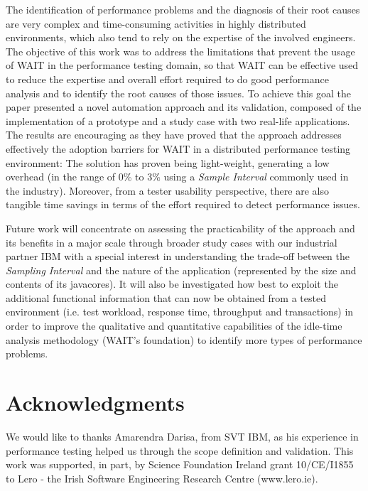 \documentclass[runningheads,a4paper]{llncs}
\begin{document}
The identification of performance problems and the diagnosis of their root
causes are very complex and time-consuming activities in highly distributed
environments, which also tend to rely on the expertise of the involved
engineers. The objective of this work was to address the limitations that
prevent the usage of WAIT in the performance testing domain, so that WAIT can be
effective used to reduce the expertise and overall effort required to do
good performance analysis and to identify the root causes of those issues.
To achieve this goal the paper presented a novel automation approach and its
validation, composed of the implementation of a prototype and a study
case with two real-life applications. The results are encouraging as they have
proved that the approach addresses effectively the adoption barriers for WAIT in 
a distributed performance testing environment: The solution has proven being
light-weight, generating a low overhead (in the range of 0\% to 3\% using a
\emph{Sample Interval} commonly used in the industry). Moreover, from a tester
usability perspective, there are also tangible time savings in terms of the effort required to detect performance issues.

Future work will concentrate on assessing the practicability of the
approach and its benefits in a major scale through broader study cases with our
industrial partner IBM with a special interest in understanding the trade-off
between the \emph{Sampling Interval} and the nature of the application
(represented by the size and contents of its javacores). It will also be
investigated how best to exploit the additional functional information that can
now be obtained from a tested environment (i.e. test workload, response time,
throughput and transactions) in order to improve the qualitative and
quantitative capabilities of the idle-time analysis methodology (WAIT's
foundation) to identify more types of performance problems.


\section*{Acknowledgments}

We would like to thanks Amarendra Darisa, from SVT IBM, as his experience in
performance testing helped us through the scope definition and validation. This
work was supported, in part, by Science Foundation Ireland grant 10/CE/I1855 to Lero - the Irish Software Engineering Research Centre (www.lero.ie).




\end{document}

